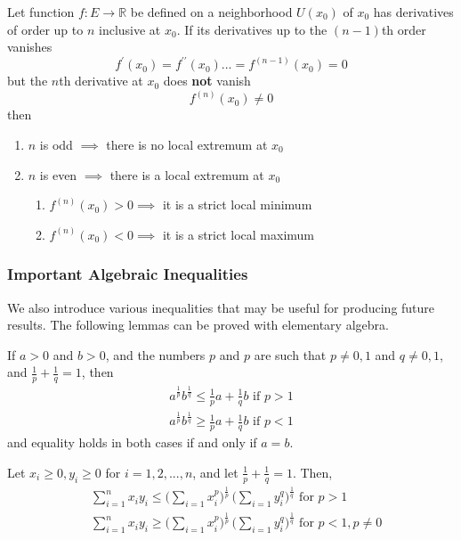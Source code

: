   \begin{proposition}
  Let function $f: E \longrightarrow \mathbb{R}$ be defined on a neighborhood $U(x_0)$ of $x_0$ has derivatives of order up to $n$ inclusive at $x_0$. If its derivatives up to the $(n-1)$th order vanishes 
  \[f^\prime (x_0) = f^{\prime\prime} (x_0) ... = f^{(n-1)} (x_0) = 0\]
  but the $n$th derivative at $x_0$ does \textbf{not} vanish
  \[f^{(n)} (x_0) \neq 0\]
  then 
  \begin{enumerate}
    \item $n$ is odd $\implies$ there is no local extremum at $x_0$ 
    \item $n$ is even $\implies$ there is a local extremum at $x_0$
    \begin{enumerate}
      \item $f^{(n)} (x_0) > 0 \implies$ it is a strict local minimum
      \item $f^{(n)} (x_0) < 0 \implies$ it is a strict local maximum
    \end{enumerate}
  \end{enumerate}
  \end{proposition}

  \subsubsection{Important Algebraic Inequalities}

  We also introduce various inequalities that may be useful for producing future results. The following lemmas can be proved with elementary algebra. 

  \begin{lemma}
    If $a>0$ and $b>0$, and the numbers $p$ and $p$ are such that $p \neq 0, 1$ and $q \neq 0, 1$, and $\frac{1}{p} + \frac{1}{q} = 1$, then 
    \begin{align*}
        a^{\frac{1}{p}} b^{\frac{1}{q}} \leq \frac{1}{p} a + \frac{1}{q} b \text{  if } p > 1 \\
        a^{\frac{1}{p}} b^{\frac{1}{q}} \geq \frac{1}{p} a + \frac{1}{q} b \text{  if } p < 1
    \end{align*}
    and equality holds in both cases if and only if $a = b$. 
  \end{lemma}

  \begin{lemma}
    Let $x_i \geq 0, y_i \geq 0$ for $i = 1, 2, ..., n$, and let $\frac{1}{p} + \frac{1}{q} = 1$. Then, 
    \begin{align*}
        &\sum_{i=1}^n x_i y_i \leq \bigg( \sum_{i=1} x_i^p \bigg)^{\frac{1}{p}} \, \bigg( \sum_{i=1} y_i^q \bigg)^{\frac{1}{q}} \text{  for } p > 1 \\
        &\sum_{i=1}^n x_i y_i \geq \bigg( \sum_{i=1} x_i^p \bigg)^{\frac{1}{p}} \, \bigg( \sum_{i=1} y_i^q \bigg)^{\frac{1}{q}} \text{  for } p < 1, p \neq 0
    \end{align*}
  \end{lemma}

